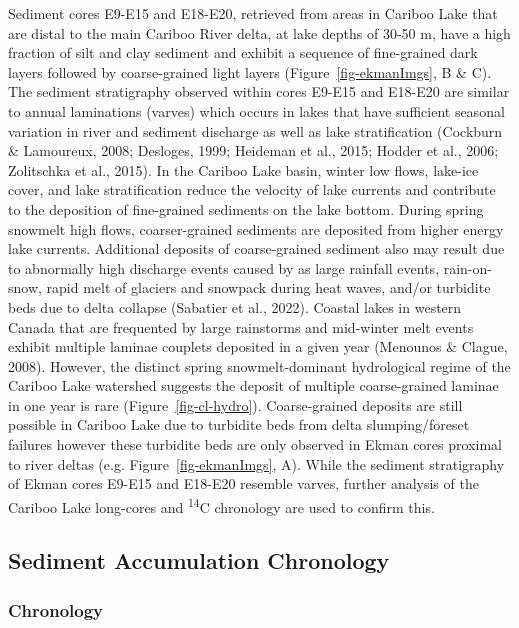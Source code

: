 \documentclass[
  letterpaper,
  DIV=11,
  numbers=noendperiod]{scrartcl}
\begin{document}
Sediment cores E9-E15 and E18-E20, retrieved from areas in Cariboo Lake
that are distal to the main Cariboo River delta, at lake depths of 30-50
m, have a high fraction of silt and clay sediment and exhibit a sequence
of fine-grained dark layers followed by coarse-grained light layers
(Figure~\ref{fig-ekmanImgs}, B \& C). The sediment stratigraphy observed
within cores E9-E15 and E18-E20 are similar to annual laminations
(varves) which occurs in lakes that have sufficient seasonal variation
in river and sediment discharge as well as lake stratification (Cockburn
\& Lamoureux, 2008; Desloges, 1999; Heideman et al., 2015; Hodder et
al., 2006; Zolitschka et al., 2015). In the Cariboo Lake basin, winter
low flows, lake-ice cover, and lake stratification reduce the velocity
of lake currents and contribute to the deposition of fine-grained
sediments on the lake bottom. During spring snowmelt high flows,
coarser-grained sediments are deposited from higher energy lake
currents. Additional deposits of coarse-grained sediment also may result
due to abnormally high discharge events caused by as large rainfall
events, rain-on-snow, rapid melt of glaciers and snowpack during heat
waves, and/or turbidite beds due to delta collapse (Sabatier et al.,
2022). Coastal lakes in western Canada that are frequented by large
rainstorms and mid-winter melt events exhibit multiple laminae couplets
deposited in a given year (Menounos \& Clague, 2008). However, the
distinct spring snowmelt-dominant hydrological regime of the Cariboo
Lake watershed suggests the deposit of multiple coarse-grained laminae
in one year is rare (Figure~\ref{fig-cl-hydro}). Coarse-grained deposits
are still possible in Cariboo Lake due to turbidite beds from delta
slumping/foreset failures however these turbidite beds are only observed
in Ekman cores proximal to river deltas (e.g.
Figure~\ref{fig-ekmanImgs}, A). While the sediment stratigraphy of Ekman
cores E9-E15 and E18-E20 resemble varves, further analysis of the
Cariboo Lake long-cores and \textsuperscript{14}C chronology are used to
confirm this.

\hypertarget{sediment-accumulation-chronology}{%
\subsection{Sediment Accumulation
Chronology}\label{sediment-accumulation-chronology}}

\hypertarget{chronology}{%
\subsubsection{Chronology}\label{chronology}}
\end{document}
